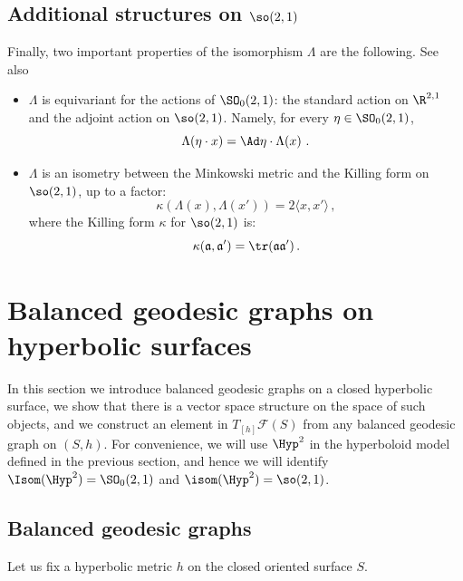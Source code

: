 \subsection*{Additional structures on \texorpdfstring{$\so(2,1)$}{so(2,1)}}

Finally, two important properties of the isomorphism $\Lambda$ are the following. See also~\cite[Section~2]{ksurfaces}
\begin{itemize}
\item $\Lambda$ is equivariant for the actions of $\SO_0(2,1)$: the standard action on $\R^{2,1}$ and the adjoint action on $\so(2,1)$. Namely, for every $\eta\in\SO_0(2,1)$,
\begin{equation}
\Lambda(\eta\cdot x)=\Ad \eta\cdot \Lambda(x)~.
\end{equation}
\item $\Lambda$ is an isometry between the Minkowski metric and the Killing form on $\so(2,1)$, up to a factor:
\begin{equation}\label{eq killing mink}
\kappa(\Lambda({x}),\Lambda({x}'))=2\langle {x},{x}'\rangle\,,
\end{equation}
where the Killing form $\kappa$ for $\so(2,1)$ is:
\[
\kappa(\mathfrak a,\mathfrak a')=\tr(\mathfrak a\mathfrak a')\,.
\]
\end{itemize}



\section{Balanced geodesic graphs on hyperbolic surfaces}\label{sec balanced graph}



In this section we introduce balanced geodesic graphs on a closed hyperbolic surface, we show that there is a vector space structure on the space of such objects, and we construct an element in $T_{[h]}\mathcal F(S)$ from any balanced geodesic graph on $(S,h)$. For convenience, we will use $\Hyp^2$ in the hyperboloid model defined in the previous section, and hence we will identify $\Isom(\Hyp^2)=\SO_0(2,1)$ and $\isom(\Hyp^2)=\so(2,1)$.

\subsection{Balanced geodesic graphs}

Let us fix a hyperbolic metric $h$ on the closed oriented surface $S$.

